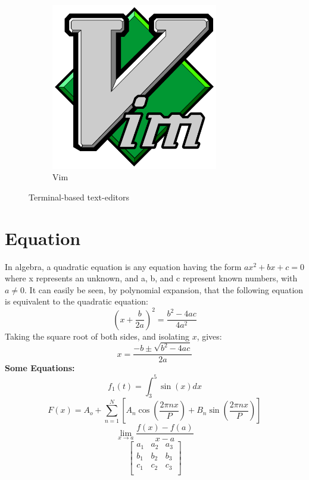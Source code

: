 \documentclass[letter, 12pt]{article}
\begin{document}
\begin{figure}[h]
\begin{subfigure}{.3\textwidth}
		\includegraphics[width=0.8\textwidth]{vimlogo.png}
		\caption{Vim}
	\end{subfigure}
	\caption{Terminal-based text-editors}
\end{figure}
\section{Equation}
In algebra, a quadratic equation is any equation having the form $ax^2 +bx+c = 0$
where x represents an unknown, and a, b, and c represent known numbers, with
$a\neq0$. It can easily be seen, by polynomial expansion, that the following
equation is equivalent to the quadratic equation:
$$\left(x+\frac{b}{2a}\right)^2=\frac{b^2-4ac}{4a^2}$$
Taking the square root of both sides, and isolating $x$, gives:
\begin{equation}
	x=\frac{-b\pm\sqrt{b^2-4ac}}{2a}
\end{equation}
\textbf{Some Equations:}
$$f_1(t)=\int_{3}^{5}\sin(x)dx$$
$$F(x)=A_o+\sum_{n=1}^{N}\left[A_n\cos\left(\frac{2\pi nx}{P}\right)+B_n\sin\left(\frac{2\pi nx}{P}\right)\right]$$
$$\lim\limits_{x \to a}\frac{f(x)-f(a)}{x-a}$$
\begin{equation}
\begin{bmatrix}
a_1 & a_2 & a_3\\
b_1 & b_2 & b_3\\
c_1 & c_2 & c_3\\
\end{bmatrix}
\end{equation}
\end{document}
